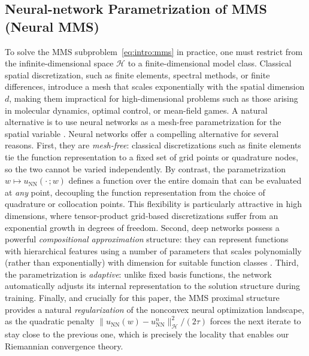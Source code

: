 \documentclass[twoside,11pt]{article}
\newcommand{\rev}[1]{#1}                           %
\newcommand{\NN}{\mathrm{NN}}
\newcommand{\calH}{\mathcal{H}}
\begin{document}
\subsection{Neural-network Parametrization of MMS (Neural MMS)}
\rev{%
To solve the MMS subproblem~\eqref{eq:intro:mms} in practice,
one must restrict from the infinite-dimensional space $\calH$ to a finite-dimensional model class.
Classical spatial discretization, such as finite elements, spectral methods, or finite differences, introduce
a mesh that scales exponentially with the spatial dimension $d$, making them impractical for
high-dimensional problems such as those arising in molecular dynamics, optimal control, or
mean-field games. A natural alternative is to use neural networks as a mesh-free parametrization for the spatial variable \citep{park2023deep,HuEnergetic2024}.
Neural networks offer a compelling alternative for several reasons.
First, they are \emph{mesh-free}: classical discretizations such as finite elements tie the
function representation to a fixed set of grid points or quadrature nodes, so the two cannot
be varied independently. By contrast, the parametrization $w\mapsto u_{\NN}(\cdot\,;w)$
defines a function over the entire domain that can be evaluated at \emph{any} point,
decoupling the function representation from the choice of quadrature or collocation points.  This flexibility is
particularly attractive in high dimensions, where tensor-product grid-based
discretizations suffer from an exponential growth in degrees of freedom.
Second, deep networks possess a powerful \emph{compositional approximation} structure:
they can represent functions with hierarchical features using a number of parameters
that scales polynomially (rather than exponentially) with dimension for suitable function
classes \citep{JMLR:v23:21-1404,maiti2024optimal}.
Third, the parametrization is \emph{adaptive}: unlike fixed basis functions, the network
automatically adjusts its internal representation to the solution structure during training.
Finally, and crucially for this paper, the MMS proximal structure provides a natural
\emph{regularization} of the nonconvex neural optimization landscape, as the quadratic penalty
$\|u_{\NN}(w)-u^n_{\NN}\|_{\calH}^2/(2\tau)$ forces the next iterate to stay close to the
previous one, which is precisely the locality that enables our Riemannian convergence theory.
}
\end{document}
